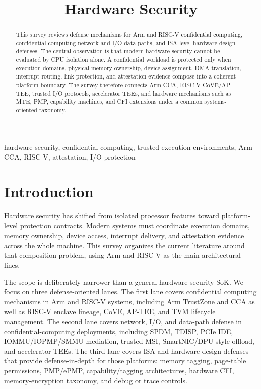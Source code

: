 \documentclass[conference]{IEEEtran}
\title{Hardware Security}
\author{\IEEEauthorblockN{Author}
\IEEEauthorblockA{Hardware Security Survey}}
\begin{document}
\maketitle

\begin{abstract}
This survey reviews defense mechanisms for Arm and RISC-V confidential
computing, confidential-computing network and I/O data paths, and ISA-level
hardware design defenses. The central observation is that modern hardware
security cannot be evaluated by CPU isolation alone. A confidential workload is
protected only when execution domains, physical-memory ownership, device
assignment, DMA translation, interrupt routing, link protection, and attestation
evidence compose into a coherent platform boundary. The survey therefore
connects Arm CCA, RISC-V CoVE/AP-TEE, trusted I/O protocols, accelerator TEEs,
and hardware mechanisms such as MTE, PMP, capability machines, and CFI
extensions under a common systems-oriented taxonomy.
\end{abstract}

\begin{IEEEkeywords}
hardware security, confidential computing, trusted execution environments,
Arm CCA, RISC-V, attestation, I/O protection
\end{IEEEkeywords}

\section{Introduction}

Hardware security has shifted from isolated processor features toward
platform-level protection contracts. Modern systems must coordinate execution
domains, memory ownership, device access, interrupt delivery, and attestation
evidence across the whole machine. This survey organizes the current literature
around that composition problem, using Arm and RISC-V as the main architectural
lines.

The scope is deliberately narrower than a general hardware-security SoK. We
focus on three defense-oriented lanes. The first lane covers confidential
computing mechanisms in Arm and RISC-V systems, including Arm TrustZone and CCA
as well as RISC-V enclave lineage, CoVE, AP-TEE, and TVM lifecycle management.
The second lane covers network, I/O, and data-path defense in
confidential-computing deployments, including SPDM, TDISP, PCIe IDE,
IOMMU/IOPMP/SMMU mediation, trusted MSI, SmartNIC/DPU-style offload, and
accelerator TEEs. The third lane covers ISA and hardware design defenses that
provide defense-in-depth for those platforms: memory tagging, page-table
permissions, PMP/ePMP, capability/tagging architectures, hardware CFI,
memory-encryption taxonomy, and debug or trace controls.
\end{document}
